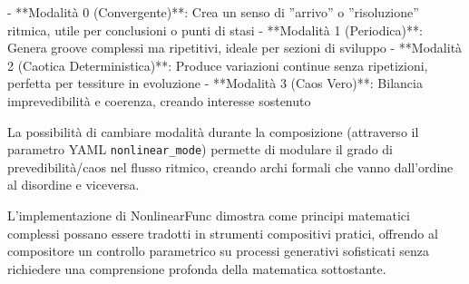 - **Modalità 0 (Convergente)**: Crea un senso di ''arrivo'' o ''risoluzione'' ritmica, utile per conclusioni o punti di stasi
- **Modalità 1 (Periodica)**: Genera groove complessi ma ripetitivi, ideale per sezioni di sviluppo
- **Modalità 2 (Caotica Deterministica)**: Produce variazioni continue senza ripetizioni, perfetta per tessiture in evoluzione
- **Modalità 3 (Caos Vero)**: Bilancia imprevedibilità e coerenza, creando interesse sostenuto

La possibilità di cambiare modalità durante la composizione (attraverso il parametro YAML \texttt{nonlinear\_mode}) permette di modulare il grado di prevedibilità/caos nel flusso ritmico, creando archi formali che vanno dall'ordine al disordine e viceversa.

L'implementazione di NonlinearFunc dimostra come principi matematici complessi possano essere tradotti in strumenti compositivi pratici, offrendo al compositore un controllo parametrico su processi generativi sofisticati senza richiedere una comprensione profonda della matematica sottostante.
